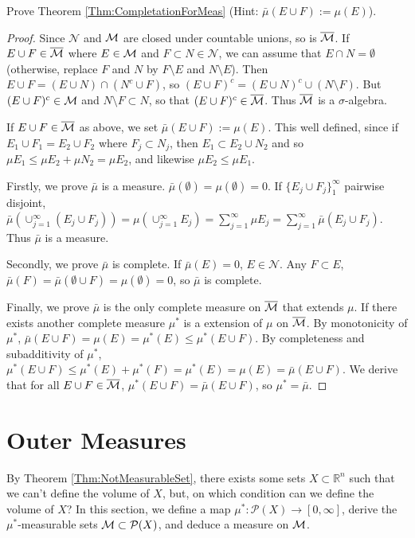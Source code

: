 \begin{exc}
    Prove Theorem \ref{Thm:CompletationForMeas} 
    (Hint: $\bar{\mu}(E\cup F):=\mu(E)$).
\end{exc}
\begin{proof}
    Since $\mathcal{N}$ and $\mathcal{M}$ are closed under countable unions,
    so is $\overline{\mathcal{M}}$.
    If $E\cup F\in\overline{\mathcal{M}}$ where $E\in\mathcal{M}$ and $F\subset N\in\mathcal{N}$,
    we can assume that $E\cap N=\emptyset$ 
    (otherwise, replace $F$ and $N$ by $F\setminus E$ and $N\setminus E$).
    Then $E\cup F=(E\cup N)\cap(N^c\cup F)$,
    so $(E\cup F)^c=(E\cup N)^c\cup(N\setminus F)$.
    But $(E\cup F)^c\in\mathcal{M}$ and $N\setminus F\subset N$, so that $(E\cup F)^c\in\overline{\mathcal{M}}$.
    Thus $\overline{\mathcal{M}}$ is a $\sigma$-algebra.

    If $E\cup F\in\overline{\mathcal{M}}$ as above, we set $\bar{\mu}(E\cup F):=\mu(E)$.
    This well defined, since if $E_1\cup F_1=E_2\cup F_2$ where $F_j\subset N_j$,
    then $E_1\subset E_2\cup N_2$ and so $\mu{E_1}\leq\mu{E_2}+\mu{N_2}=\mu{E_2}$,
    and likewise $\mu{E_2}\leq\mu{E_1}$.

    Firstly, we prove $\bar{\mu}$ is a measure. $\bar{\mu}(\emptyset)=\mu(\emptyset)=0$.
    If $\{E_j\cup F_j\}_{1}^{\infty}$ pairwise disjoint, 
    $\bar{\mu}(\cup_{j=1}^{\infty}(E_j\cup F_j))=\mu(\cup_{j=1}^{\infty}E_j)=\sum_{j=1}^{\infty}\mu{E_j}=\sum_{j=1}^{\infty}\bar{\mu}(E_j\cup F_j)$.
    Thus $\bar{\mu}$ is a measure.

    Secondly, we prove $\bar{\mu}$ is complete. If $\bar{\mu}(E)=0$, $E\in\mathcal{N}$.
    Any $F\subset E$, $\bar{\mu}(F)=\bar{\mu}(\emptyset\cup F)=\mu(\emptyset)=0$, 
    so $\bar{\mu}$ is complete.

    Finally, we prove $\bar{\mu}$ is the only complete measure on $\overline{\mathcal{M}}$ that extends $\mu$.
    If there exists another complete measure $\mu^*$ is a extension of $\mu$ on $\overline{\mathcal{M}}$.
    By monotonicity of $\mu^*$, $\bar{\mu}(E\cup F)=\mu(E)=\mu^*(E)\leq\mu^*(E\cup F)$.
    By completeness and subadditivity of $\mu^*$, 
    $\mu^*(E\cup F)\leq\mu^*(E)+\mu^*(F)=\mu^*(E)=\mu(E)=\bar{\mu}(E\cup F)$.
    We derive that for all $E\cup F\in\overline{\mathcal{M}}$, $\mu^*(E\cup F)=\bar{\mu}(E\cup F)$, 
    so $\mu^*=\bar{\mu}$.
\end{proof}
\section{Outer Measures}
\begin{rem}
    By Theorem \ref{Thm:NotMeasurableSet}, there exists 
    some sets $X\subset\mathbb{R}^{n}$ such that we can't define the 
    volume of $X$, but, on which condition can we define the volume of $X$?
    In this section, we define a map 
    $\mu^{*}:\mathcal{P}(X)\rightarrow [0,\infty]$, derive the 
    $\mu^{*}$-measurable sets $\mathcal{M}\subset \mathcal{P}(X)$, and 
    deduce a measure on $\mathcal{M}$. 
\end{rem}
